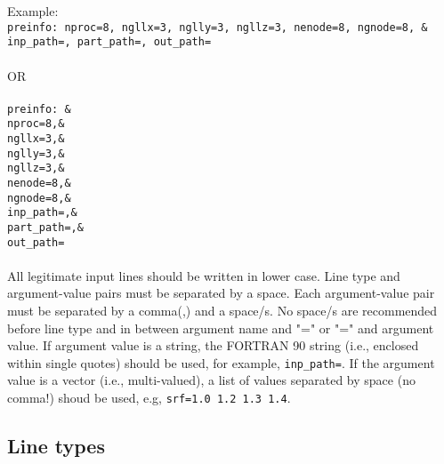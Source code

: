 Example:\\
\texttt{preinfo: nproc=8, ngllx=3, nglly=3, ngllz=3, nenode=8, ngnode=8, \& \\
inp\_path=, part\_path=, out\_path=}\\
\\
OR
\\
\\
\texttt{preinfo:   \quad\&\\
          \hspace*{18pt} nproc=8,\&\\
          \hspace*{18pt} ngllx=3,\&\\
          \hspace*{18pt} nglly=3,\&\\
          \hspace*{18pt} ngllz=3,\&\\
          \hspace*{18pt} nenode=8,\&\\
          \hspace*{18pt} ngnode=8,\&\\
          \hspace*{18pt} inp\_path=,\&\\
          \hspace*{18pt} part\_path=,\&\\
          \hspace*{18pt} out\_path=}\\
\\
All legitimate input lines should be written in lower case. Line type and argument-value pairs must be separated by a space. Each argument-value pair must be separated by a comma(,) and a space/s. No space/s are recommended before line type and in between argument name and "=" or "=" and argument value. If argument value is a string, the FORTRAN 90 string (i.e., enclosed within single quotes) should be used, for example, \texttt{inp\_path=}. If the argument value is a vector (i.e., multi-valued), a list of values separated by space (no comma!) shoud be used, e.g, \texttt{srf=1.0 1.2 1.3 1.4}.

\subsection{Line types}


